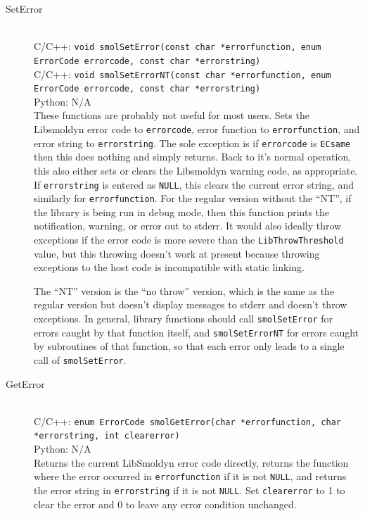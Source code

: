 \documentclass {scrbook}
\newcommand {\ttt} {\texttt}
\begin{document}
\begin{description}

\item[SetError]
\hfill \\
C/C++: \ttt{void smolSetError(const char *errorfunction, enum ErrorCode errorcode, const char *errorstring)}\\
C/C++: \ttt{void smolSetErrorNT(const char *errorfunction, enum ErrorCode errorcode, const char *errorstring)}\\
Python: N/A\\
These functions are probably not useful for most users. Sets the Libsmoldyn error code to \ttt{errorcode}, error function to \ttt{errorfunction}, and error string to \ttt{errorstring}. The sole exception is if \ttt{errorcode} is \ttt{ECsame} then this does nothing and simply returns. Back to it's normal operation, this also either sets or clears the Libsmoldyn warning code, as appropriate. If \ttt{errorstring} is entered as \ttt{NULL}, this clears the current error string, and similarly for \ttt{errorfunction}. For the regular version without the ``NT'', if the library is being run in debug mode, then this function prints the notification, warning, or error out to stderr. It would also ideally throw exceptions if the error code is more severe than the \ttt{LibThrowThreshold} value, but this throwing doesn't work at present because throwing exceptions to the host code is incompatible with static linking.

The ``NT'' version is the ``no throw'' version, which is the same as the regular version but doesn't display messages to stderr and doesn't throw exceptions. In general, library functions should call \ttt{smolSetError} for errors caught by that function itself, and \ttt{smolSetErrorNT} for errors caught by subroutines of that function, so that each error only leads to a single call of \ttt{smolSetError}.

\item[GetError]
\hfill \\
C/C++: \ttt{enum ErrorCode smolGetError(char *errorfunction, char *errorstring, int clearerror)}\\
Python: N/A\\
Returns the current LibSmoldyn error code directly, returns the function where the error occurred in \ttt{errorfunction} if it is not \ttt{NULL}, and returns the error string in \ttt{errorstring} if it is not \ttt{NULL}. Set \ttt{clearerror} to 1 to clear the error and 0 to leave any error condition unchanged.


\end{description}
\end{document}
